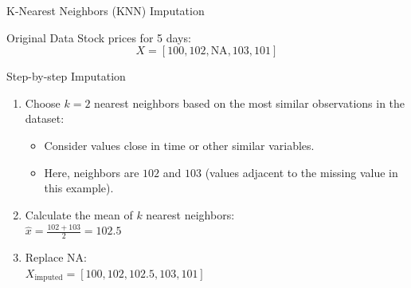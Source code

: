 \documentclass{beamer}
\begin{document}
\begin{frame}{K-Nearest Neighbors (KNN) Imputation}
   \begin{block}{Original Data}
       Stock prices for 5 days:
       \[
       X = [100, 102, \text{NA}, 103, 101]
       \]
   \end{block}

   \begin{block}{Step-by-step Imputation}
       \begin{enumerate}
           \item Choose $k=2$ nearest neighbors based on the most similar observations in the dataset:
           \begin{itemize}
               \item Consider values close in time or other similar variables.
               \item Here, neighbors are $102$ and $103$ (values adjacent to the missing value in this example).
           \end{itemize}
           \item Calculate the mean of $k$ nearest neighbors:\\
           $\hat{x} = \frac{102 + 103}{2} = 102.5$
           \item Replace NA:\\
           $X_{\text{imputed}} = [100, 102, \mathbf{102.5}, 103, 101]$
       \end{enumerate}
   \end{block}

\end{frame}
\end{document}
